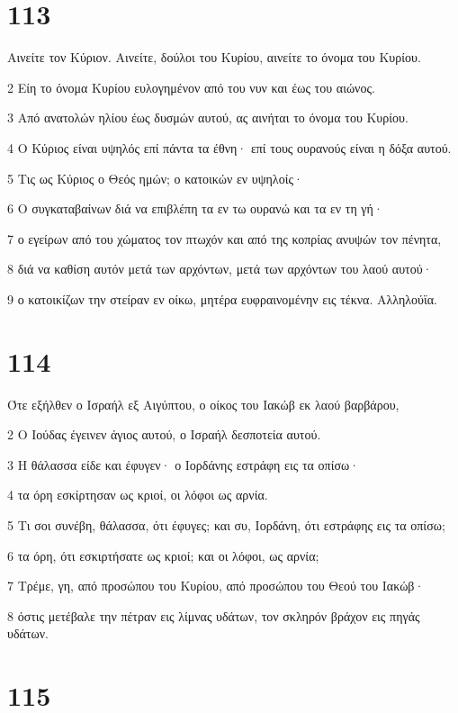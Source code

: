 \chapter{113}

\par Αινείτε τον Κύριον. Αινείτε, δούλοι του Κυρίου, αινείτε το όνομα του Κυρίου.
\par 2 Είη το όνομα Κυρίου ευλογημένον από του νυν και έως του αιώνος.
\par 3 Από ανατολών ηλίου έως δυσμών αυτού, ας αινήται το όνομα του Κυρίου.
\par 4 Ο Κύριος είναι υψηλός επί πάντα τα έθνη· επί τους ουρανούς είναι η δόξα αυτού.
\par 5 Τις ως Κύριος ο Θεός ημών; ο κατοικών εν υψηλοίς·
\par 6 Ο συγκαταβαίνων διά να επιβλέπη τα εν τω ουρανώ και τα εν τη γή·
\par 7 ο εγείρων από του χώματος τον πτωχόν και από της κοπρίας ανυψών τον πένητα,
\par 8 διά να καθίση αυτόν μετά των αρχόντων, μετά των αρχόντων του λαού αυτού·
\par 9 ο κατοικίζων την στείραν εν οίκω, μητέρα ευφραινομένην εις τέκνα. Αλληλούϊα.

\chapter{114}

\par Ότε εξήλθεν ο Ισραήλ εξ Αιγύπτου, ο οίκος του Ιακώβ εκ λαού βαρβάρου,
\par 2 Ο Ιούδας έγεινεν άγιος αυτού, ο Ισραήλ δεσποτεία αυτού.
\par 3 Η θάλασσα είδε και έφυγεν· ο Ιορδάνης εστράφη εις τα οπίσω·
\par 4 τα όρη εσκίρτησαν ως κριοί, οι λόφοι ως αρνία.
\par 5 Τι σοι συνέβη, θάλασσα, ότι έφυγες; και συ, Ιορδάνη, ότι εστράφης εις τα οπίσω;
\par 6 τα όρη, ότι εσκιρτήσατε ως κριοί; και οι λόφοι, ως αρνία;
\par 7 Τρέμε, γη, από προσώπου του Κυρίου, από προσώπου του Θεού του Ιακώβ·
\par 8 όστις μετέβαλε την πέτραν εις λίμνας υδάτων, τον σκληρόν βράχον εις πηγάς υδάτων.

\chapter{115}

